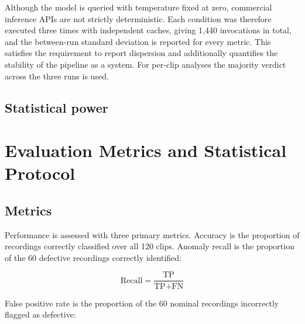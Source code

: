 Although the model is queried with temperature fixed at zero, commercial
inference APIs are not strictly deterministic. Each condition was
therefore executed three times with independent caches, giving 1{,}440
invocations in total, and the between-run standard deviation is reported
for every metric. This satisfies the requirement to report dispersion and
additionally quantifies the stability of the pipeline as a system. For
per-clip analyses the majority verdict across the three runs is used.

\subsection{Statistical power}

%


\section{Evaluation Metrics and Statistical Protocol}
\label{sec:benchmarking}

\subsection{Metrics}

Performance is assessed with three primary metrics. Accuracy is the
proportion of recordings correctly classified over all 120 clips. Anomaly
recall is the proportion of the 60 defective recordings correctly
identified:

\begin{equation}
  \text{Recall} = \frac{\text{TP}}{\text{TP} + \text{FN}}
\end{equation}

False positive rate is the proportion of the 60 nominal recordings
incorrectly flagged as defective:

